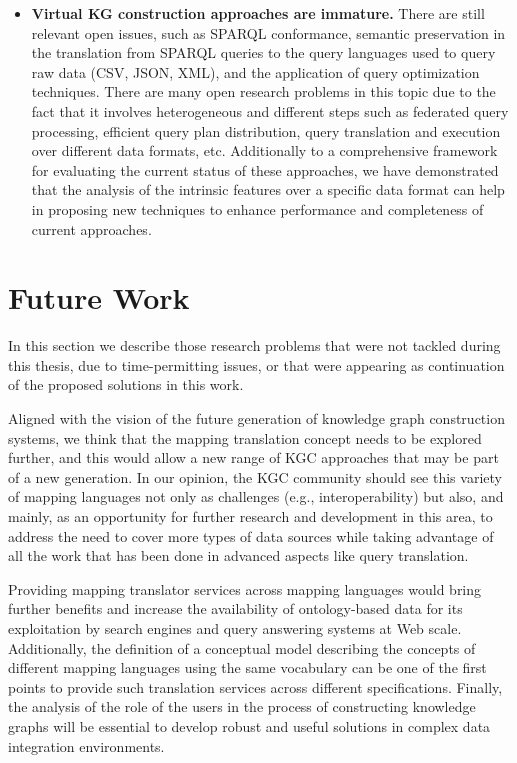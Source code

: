 \begin{itemize}
    \item \textbf{Virtual KG construction approaches are immature.} There are still relevant open issues, such as SPARQL conformance, semantic preservation in the translation from SPARQL queries to the query languages used to query raw data (CSV, JSON, XML), and the application of query optimization techniques. There are many open research problems in this topic due to the fact that it involves heterogeneous and different steps such as federated query processing, efficient query plan distribution, query translation and execution over different data formats, etc. Additionally to a comprehensive framework for evaluating the current status of these approaches, we have demonstrated that the analysis of the intrinsic features over a specific data format can help in proposing new techniques to enhance performance and completeness of current approaches. 
\end{itemize}


\section{Future Work}
In this section we describe those research problems that were not tackled during this thesis, due to time-permitting issues, or that were appearing as continuation of the proposed solutions in this work.

Aligned with the vision of the future generation of knowledge graph construction systems, we think that the mapping translation concept needs to be explored further, and this would allow a new range of KGC approaches that may be part of a new generation. In our opinion, the KGC community should see this variety of mapping languages not only as challenges (e.g., interoperability) but also, and mainly, as an opportunity for further research and development in this area, to address the need to cover more types of data sources while taking advantage of all the work that has been done in advanced aspects like query translation. 

Providing mapping translator services across mapping languages would bring further benefits and increase the availability of ontology-based data for its exploitation by search engines and query answering systems at Web scale. Additionally, the definition of a conceptual model describing the concepts of different mapping languages using the same vocabulary can be one of the first points to provide such translation services across different specifications. Finally, the analysis of the role of the users in the process of constructing knowledge graphs will be essential to develop robust and useful solutions in complex data integration environments.

